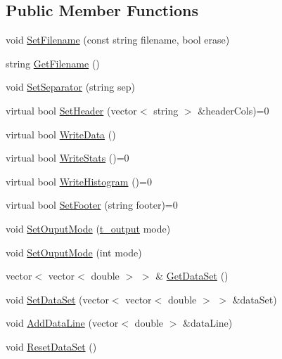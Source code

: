 \subsection*{Public Member Functions}
\begin{DoxyCompactItemize}
\item 
void \hyperlink{classelps_1_1_lab_outputer_a07c1f50b2f68e09c785257f59cc02989}{Set\+Filename} (const string filename, bool erase)
\item 
string \hyperlink{classelps_1_1_lab_outputer_abb511e85d9689dbfa77d5a57fbc63260}{Get\+Filename} ()
\item 
void \hyperlink{classelps_1_1_lab_outputer_a44b5ef030d5099fb22e4fc92d4bf9e02}{Set\+Separator} (string sep)
\item 
virtual bool \hyperlink{classelps_1_1_lab_outputer_a3fce40affff7539f6d59768830fd4e03}{Set\+Header} (vector$<$ string $>$ \&header\+Cols)=0
\item 
virtual bool \hyperlink{classelps_1_1_lab_outputer_a53cc31c61d5fe48be47e3eaa9ee505cf}{Write\+Data} ()
\item 
virtual bool \hyperlink{classelps_1_1_lab_outputer_a15d6faa05e150c15c51da1a05f1f0c4d}{Write\+Stats} ()=0
\item 
virtual bool \hyperlink{classelps_1_1_lab_outputer_ad1ebbfd4fe1c0eb996b013dd8ab5f83a}{Write\+Histogram} ()=0
\item 
virtual bool \hyperlink{classelps_1_1_lab_outputer_a03a665502df3322215595a35e624cb85}{Set\+Footer} (string footer)=0
\item 
void \hyperlink{classelps_1_1_lab_outputer_a6af708654be42ff33dcc71816656ad9f}{Set\+Ouput\+Mode} (\hyperlink{classelps_1_1_lab_outputer_ad470fb25f86cffd24bc24c56414d5be5}{t\+\_\+output} mode)
\item 
void \hyperlink{classelps_1_1_lab_outputer_a670b381b94701a2d60b3efc710465a8a}{Set\+Ouput\+Mode} (int mode)
\item 
vector$<$ vector$<$ double $>$ $>$ \& \hyperlink{classelps_1_1_lab_outputer_a644069fd371fbe58381f1af8162908b6}{Get\+Data\+Set} ()
\item 
void \hyperlink{classelps_1_1_lab_outputer_a7b86c7d5a768e78873695c061683f5c8}{Set\+Data\+Set} (vector$<$ vector$<$ double $>$ $>$ \&data\+Set)
\item 
void \hyperlink{classelps_1_1_lab_outputer_a41353b7d293c1902b531eead2a31c644}{Add\+Data\+Line} (vector$<$ double $>$ \&data\+Line)
\item 
void \hyperlink{classelps_1_1_lab_outputer_a67f51790de5d35de729ead50e33ad531}{Reset\+Data\+Set} ()

\end{DoxyCompactItemize}
